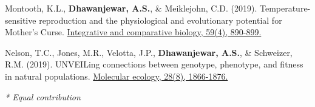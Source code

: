 \begin{cvpubs}
  \pubentry
    {Montooth, K.L., \textbf{Dhawanjewar, A.S.}, \& Meiklejohn, C.D. (2019).}
	{Temperature-sensitive reproduction and the physiological and evolutionary potential for Mother's Curse.}	{\href{https://doi.org/10.1093/icb/icz091}{Integrative and comparative biology, 59(4), 890-899.}}

  \pubentry
    {Nelson, T.C., Jones, M.R., Velotta, J.P., \textbf{Dhawanjewar, A.S.}, \& Schweizer, R.M. (2019).}
	{UNVEILing connections between genotype, phenotype, and fitness in natural populations.}
	{\href{https://doi.org/10.1111/mec.15067}{Molecular ecology, 28(8), 1866-1876.}}

	\fontsize{10pt}{1em}\bodyfontlight\itshape\color{graytext} * Equal contribution

\end{cvpubs}

\vspace{2mm}


 \\


